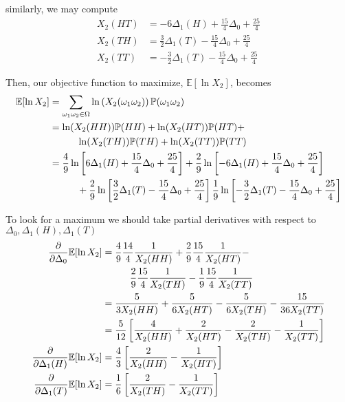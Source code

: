 \documentclass[12pt]{article}
\renewcommand{\P}{\mathbb P}
\newcommand{\E}{\mathbb E}
\begin{document}
similarly, we may compute
\begin{align*}
	X_2(HT) &= -6\Delta_1(H) + \frac{15}{4}\Delta_0 + \frac{25}{4} \\
	X_2(TH) &= \frac{3}{2}\Delta_1(T) - \frac{15}{4}\Delta_0 + \frac{25}{4} \\
	X_2(TT) &= -\frac{3}{2}\Delta_1(T) - \frac{15}{4}\Delta_0 + \frac{25}{4}
\end{align*}

Then, our objective function to maximize, $\E[\ln X_2]$, becomes
\begin{align*}
	\E[\ln X_2] &= \sum_{\omega_1\omega_2 \in \Omega} \ln \left( X_2(\omega_1\omega_2) \right) \P(\omega_1\omega_2) \\
	&= \ln(X_2(HH))\P(HH) + \ln(X_2(HT))\P(HT) +  \\
	&\hphantom{{}={--}} \ln(X_2(TH))\P(TH) + \ln(X_2(TT))\P(TT) \\
	&= \frac{4}{9} \ln \left[ 6\Delta_1(H) + \frac{15}{4}\Delta_0 + \frac{25}{4} \right] + \frac{2}{9} \ln \left[ -6\Delta_1(H) + \frac{15}{4}\Delta_0 + \frac{25}{4} \right] \\
	&\hphantom{{}={--}} + \frac{2}{9} \ln \left[ \frac{3}{2}\Delta_1(T) - \frac{15}{4}\Delta_0 + \frac{25}{4} \right] \frac{1}{9} \ln \left[ -\frac{3}{2}\Delta_1(T) - \frac{15}{4}\Delta_0 + \frac{25}{4} \right] 
\end{align*}

To look for a maximum we should take partial derivatives with respect to $\Delta_0, \Delta_1(H), \Delta_1(T)$
\begin{align*}
	\frac{ \partial }{\partial\Delta_0} \E[\ln X_2] &= \frac{4}{9}\frac{14}{4}\frac{1}{X_2(HH)} + \frac{2}{9}\frac{15}{4}\frac{1}{X_2(HT)} - \\
	&\hphantom{{}={--}} \frac{2}{9}\frac{15}{4}\frac{1}{X_2(TH)} - \frac{1}{9}\frac{15}{4}\frac{1}{X_2(TT)} \\
	&= \frac{5}{3X_2(HH)} + \frac{5}{6X_2(HT)} - \frac{5}{6X_2(TH)} - \frac{15}{36X_2(TT)} \\
	&= \frac{5}{12} \left[ \frac{4}{X_2(HH)} + \frac{2}{X_2(HT)} - \frac{2}{X_2(TH)} - \frac{1}{X_2(TT)} \right] \\
	\frac{ \partial }{\partial\Delta_1(H)} \E[\ln X_2] &= \frac{4}{3} \left[ \frac{2}{X_2(HH)} - \frac{1}{X_2(HT)} \right] \\
	\frac{ \partial }{\partial\Delta_1(T)} \E[\ln X_2] &= \frac{1}{6} \left[ \frac{2}{X_2(TH)} - \frac{1}{X_2(TT)} \right]
\end{align*}
\end{document}
